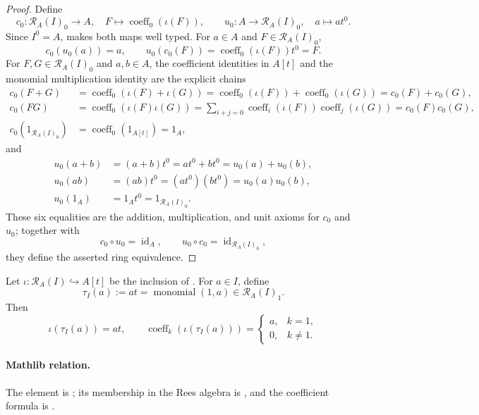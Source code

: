 \begin{proof}
  Define
  \[
    c_0\colon\mathcal R_A(I)_0\to A,
      \quad F\mapsto\operatorname{coeff}_0(\iota(F)),
    \qquad
    u_0\colon A\to\mathcal R_A(I)_0,
      \quad a\mapsto at^0.
  \]
  Since $I^0=A$,  makes both maps
  well typed.  For $a\in A$ and $F\in\mathcal R_A(I)_0$,
  \[
    c_0(u_0(a))=a,
    \qquad
    u_0(c_0(F))
      =\operatorname{coeff}_0(\iota(F))t^0=F.
  \]
  For $F,G\in\mathcal R_A(I)_0$ and $a,b\in A$, the coefficient identities
  in $A[t]$ and the monomial multiplication identity are the explicit chains
  \[
  \begin{aligned}
    c_0(F+G)
      &=\operatorname{coeff}_0(\iota(F)+\iota(G))
       =\operatorname{coeff}_0(\iota(F))
          +\operatorname{coeff}_0(\iota(G))
       =c_0(F)+c_0(G),\\
    c_0(FG)
      &=\operatorname{coeff}_0(\iota(F)\iota(G))
       =\sum_{i+j=0}\operatorname{coeff}_i(\iota(F))
          \operatorname{coeff}_j(\iota(G))
       =c_0(F)c_0(G),\\
    c_0(1_{\mathcal R_A(I)_0})
      &=\operatorname{coeff}_0(1_{A[t]})=1_A,
  \end{aligned}
  \]
  and
  \[
  \begin{aligned}
    u_0(a+b)&=(a+b)t^0=at^0+bt^0=u_0(a)+u_0(b),\\
    u_0(ab)&=(ab)t^0=(at^0)(bt^0)=u_0(a)u_0(b),\\
    u_0(1_A)&=1_At^0=1_{\mathcal R_A(I)_0}.
  \end{aligned}
  \]
  These six equalities are the addition, multiplication, and unit axioms for
  $c_0$ and $u_0$; together with
  \[
    c_0\circ u_0=\operatorname{id}_A,
    \qquad
    u_0\circ c_0=\operatorname{id}_{\mathcal R_A(I)_0},
  \]
  they define the asserted ring equivalence.
\end{proof}

\begin{lemma}
  \label{lemma:nagata-rees-degree-one-element}

  Let $\iota\colon\mathcal R_A(I)\hookrightarrow A[t]$ be the inclusion of
  .  For $a\in I$, define
  \[
    \tau_I(a):=at=\operatorname{monomial}(1,a)\in\mathcal R_A(I)_1.
  \]
  Then
  \[
    \iota(\tau_I(a))=at,
    \qquad
    \operatorname{coeff}_k(\iota(\tau_I(a)))
      =\begin{cases}a,&k=1,\\0,&k\ne1.
        \end{cases}
  \]

  \paragraph{Mathlib relation.}
  The element is \texttt{}; its membership
  in the Rees algebra is
  \texttt{}, and the coefficient
  formula is \texttt{}.
\end{lemma}

